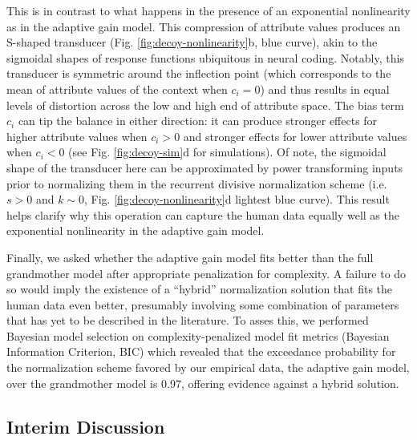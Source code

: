 \documentclass[a4paper, nobind]{templates/ociamthesis}
\begin{document}
This is in contrast to what happens in the presence of an exponential nonlinearity as in the adaptive gain model. This compression of attribute values produces an S-shaped transducer (Fig. \ref{fig:decoy-nonlinearity}b, blue curve), akin to the sigmoidal shapes of response functions ubiquitous in neural coding. Notably, this transducer is symmetric around the inflection point (which corresponds to the mean of attribute values of the context when \(c_i=0\)) and thus results in equal levels of distortion across the low and high end of attribute space. The bias term \(c_i\) can tip the balance in either direction: it can produce stronger effects for higher attribute values when \(c_i>0\) and stronger effects for lower attribute values when \(c_i<0\) (see Fig. \ref{fig:decoy-sim}d for simulations). Of note, the sigmoidal shape of the transducer here can be approximated by power transforming inputs prior to normalizing them in the recurrent divisive normalization scheme (i.e.~\(s>0\) and \(k\sim 0\), Fig. \ref{fig:decoy-nonlinearity}d lightest blue curve). This result helps clarify why this operation can capture the human data equally well as the exponential nonlinearity in the adaptive gain model.

Finally, we asked whether the adaptive gain model fits better than the full grandmother model after appropriate penalization for complexity. A failure to do so would imply the existence of a ``hybrid'' normalization solution that fits the human data even better, presumably involving some combination of parameters that has yet to be described in the literature. To asses this, we performed Bayesian model selection on complexity-penalized model fit metrics (Bayesian Information Criterion, BIC) which revealed that the exceedance probability for the normalization scheme favored by our empirical data, the adaptive gain model, over the grandmother model is 0.97, offering evidence against a hybrid solution.

\hypertarget{interim-discussion-1}{%
\subsection{Interim Discussion}\label{interim-discussion-1}}
\end{document}
